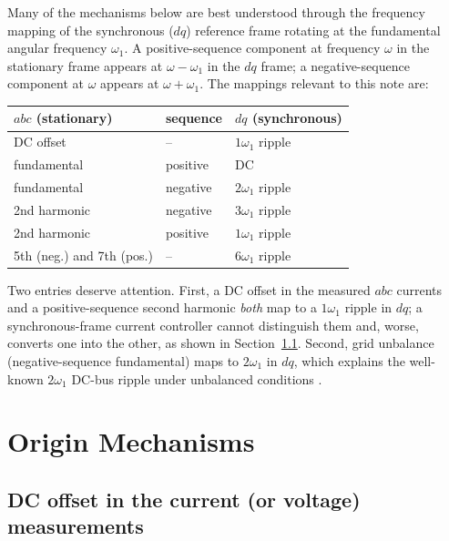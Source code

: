 \documentclass[11pt,a4paper]{article}
\newcommand{\dq}{\ensuremath{dq}}
\begin{document}
Many of the mechanisms below are best understood through the frequency mapping
of the synchronous ($\dq$) reference frame rotating at the fundamental
angular frequency $\omega_1$. A positive-sequence component at frequency
$\omega$ in the stationary frame appears at $\omega - \omega_1$ in the
$\dq$ frame; a negative-sequence component at $\omega$ appears at
$\omega + \omega_1$. The mappings relevant to this note are:
%
\begin{center}
\begin{tabular}{lll}
\toprule
$abc$ (stationary) & sequence & $\dq$ (synchronous) \\
\midrule
DC offset                & --            & $1\omega_1$ ripple \\
fundamental              & positive      & DC \\
fundamental              & negative      & $2\omega_1$ ripple \\
2nd harmonic             & negative      & $3\omega_1$ ripple \\
2nd harmonic             & positive      & $1\omega_1$ ripple \\
5th (neg.) and 7th (pos.)& --            & $6\omega_1$ ripple \\
\bottomrule
\end{tabular}
\end{center}
%
Two entries deserve attention. First, a DC offset in the measured $abc$
currents and a positive-sequence second harmonic \emph{both} map to a
$1\omega_1$ ripple in $\dq$; a synchronous-frame current controller cannot
distinguish them and, worse, converts one into the other, as shown in
Section~\ref{sec:offset}. Second, grid unbalance (negative-sequence
fundamental) maps to $2\omega_1$ in $\dq$, which explains the well-known
$2\omega_1$ DC-bus ripple under unbalanced conditions \cite{yazdani,teodorescu}.

\section{Origin Mechanisms}

\subsection{DC offset in the current (or voltage) measurements}
\label{sec:offset}
\end{document}
